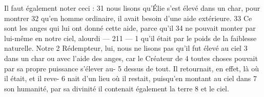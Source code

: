 Il faut également noter ceci :	 
31	 	nous lisons qu'Élie s'est élevé dans un char, pour montrer	 
32	 	qu'en homme ordinaire, il avait besoin d'une aide extérieure.	 
33	 	Ce sont les anges qui lui ont donné cette aide, parce qu'il	 
34	 	ne pouvait monter par lui-même en notre ciel, alourdi	 
 	--- 211 ---	 
1	 	qu'il était par le poids de la faiblesse naturelle. Notre	 
2	 	Rédempteur, lui, nous ne lisons pas qu'il fut élevé au ciel	 
3	 	dans un char ou avec l'aide des anges, car le Créateur de	 
4	 	toutes choses pouvait par sa propre puissance s'élever au-	 
5	 	dessus de tout. Il retournait, en effet, là où il était, et il reve-	 
6	 	nait d'un lieu où il restait, puisqu'en montant au ciel dans	 
7	 	son humanité, par sa divinité il contenait également la terre	 
8	 	et le ciel.